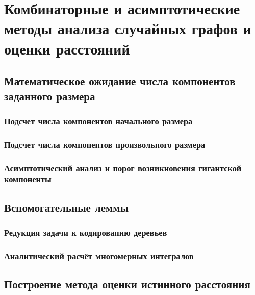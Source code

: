 \chapter{Комбинаторные и асимптотические методы анализа случайных графов и оценки расстояний}
\label{chap:graph_analysis}

\section{Математическое ожидание числа компонентов заданного размера}
\label{sec:component_count_estimation}

\subsection{Подсчет числа компонентов начального размера}
\label{subsec:initial_size_component_count}

\subsection{Подсчет числа компонентов произвольного размера}
\label{subsec:arbitrary_size_component_count}

\subsection{Асимптотический анализ и порог возникновения гигантской компоненты}
\label{subsec:giant_component_threshold}

\section{Вспомогательные леммы}
\label{sec:auxiliary_lemmas}

\subsection{Редукция задачи к кодированию деревьев}
\label{subsec:prufer_codes}

\subsection{Аналитический расчёт многомерных интегралов}
\label{subsec:multidimensional_integral}

\section{Построение метода оценки истинного расстояния}
